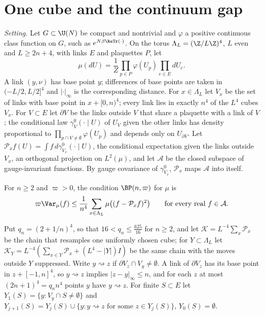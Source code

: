 
\section{One cube and the continuum gap}\label{sec:cube}

\emph{Setting.} Let $G\subset\U(N)$ be compact and nontrivial and $\varphi$ a
positive continuous class function on $G$, such as $e^{N\beta\ReTr(\cdot)}$. On
the torus $\Lambda_L=(\Z/L\Z)^4$, $L$ even and $L\ge2n+4$, with links $E$ and
plaquettes $P$, let
\[
\mu(dU)=\frac1Z\prod_{p\in P}\varphi(U_p)\prod_{e\in E}dU_e .
\]
A link $(y,\nu)$ has base point $y$; differences of base points are taken in
$(-L/2,L/2]^4$ and $|\cdot|_\infty$ is the corresponding distance. For
$x\in\Lambda_L$ let $V_x$ be the set of links with base point in $x+[0,n)^4$;
every link lies in exactly $n^4$ of the $L^4$ cubes $V_x$. For $V\subset E$ let
$\partial V$ be the links outside $V$ that share a plaquette with a link of
$V$; the conditional law $\gamma^0_V(\cdot\mid U)$ of $U_V$ given the other links
has density proportional to $\prod_{p\cap V\ne\emptyset}\varphi(U_p)$ and depends
only on $U_{\partial V}$. Let $\mathcal P_xf(U)=\int f\,d\gamma^0_{V_x}(\cdot\mid U)$,
the conditional expectation given the links outside $V_x$, an orthogonal
projection on $L^2(\mu)$, and let $\mathcal A$ be the closed subspace of
gauge-invariant functions. By gauge covariance of $\gamma^0_{V_x}$, $\mathcal P_x$
maps $\mathcal A$ into itself.

\begin{definition}\label{def:bp}
For $n\ge2$ and $\varpi>0$, the condition $\BP(n,\varpi)$ for $\mu$ is
\[
\varpi\Var_\mu(f)\le\frac1{n^4}\sum_{x\in\Lambda_L}\mu\bigl((f-\mathcal P_xf)^2\bigr)
\qquad\text{for every real }f\in\mathcal A .
\]
\end{definition}

Put $q_n=(2+1/n)^4$, so that $16<q_n\le\frac{625}{16}$ for $n\ge2$, and let
$\mathcal K=L^{-4}\sum_x\mathcal P_x$ be the chain that resamples one uniformly
chosen cube; for $Y\subset\Lambda_L$ let $\mathcal K_Y=L^{-4}(\sum_{x\in Y}\mathcal P_x
+(L^4-|Y|)I)$ be the same chain with the moves outside $Y$ suppressed. Write
$y\rightsquigarrow z$ if $\partial V_z\cap V_y\ne\emptyset$. A link of $\partial
V_z$ has its base point in $z+[-1,n]^4$, so $y\rightsquigarrow z$ implies
$|z-y|_\infty\le n$, and for each $z$ at most $(2n+1)^4=q_nn^4$ points $y$ have
$y\rightsquigarrow z$. For finite $S\subset E$ let $Y_1(S)=\{y:V_y\cap S\ne
\emptyset\}$ and $Y_{j+1}(S)=Y_j(S)\cup\{y:y\rightsquigarrow z\text{ for some }
z\in Y_j(S)\}$, $Y_0(S)=\emptyset$.

